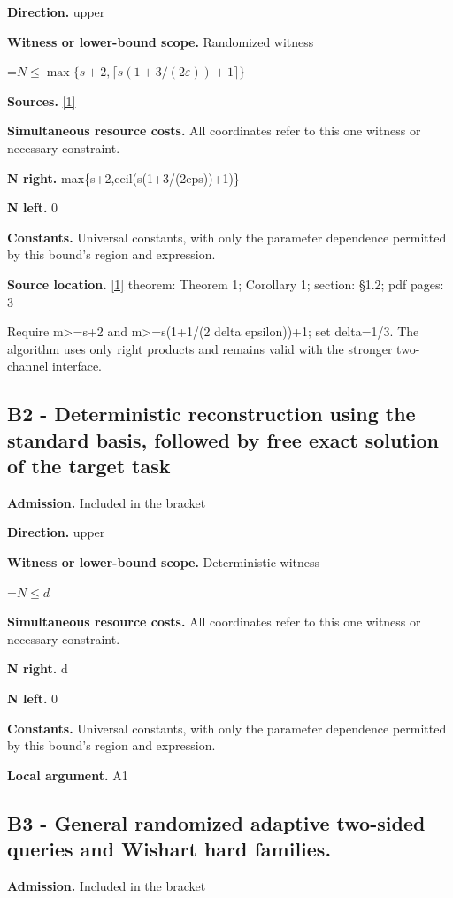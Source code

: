 \documentclass[10pt,a4paper]{article}
\newcommand{\AtlasMath}[1]{\par\begingroup\centering\setbox0=\hbox{$\displaystyle #1$}\ifdim\wd0>1.4\linewidth\typeout{ATLAS WIDE FORMULA: \the\wd0}\fi\ifdim\wd0>\linewidth\resizebox{\linewidth}{!}{\box0}\else\box0\fi\par\endgroup}
\begin{document}
\textbf{Direction.} upper

\textbf{Witness or lower-bound scope.} Randomized witness

\AtlasMath{N\le\max\{s+2,\lceil s(1+3/(2\varepsilon))+1\rceil\}}
\textbf{Sources.} \href{https://arxiv.org/pdf/2402.09379v3}{[1]}

\textbf{Simultaneous resource costs.} All coordinates refer to this one witness or necessary constraint.

\textbf{N right.} max\{s+2,ceil(s(1+3/(2eps))+1)\}

\textbf{N left.} 0

\textbf{Constants.} Universal constants, with only the parameter dependence permitted by this bound’s region and expression.

\textbf{Source location.} \href{https://arxiv.org/pdf/2402.09379v3}{[1]} theorem: Theorem 1; Corollary 1; section: §1.2; pdf pages: 3

Require m>=s+2 and m>=s(1+1/(2 delta epsilon))+1; set delta=1/3. The algorithm uses only right products and remains valid with the stronger two-channel interface.

\subsection{B2 - Deterministic reconstruction using the standard basis, followed by free exact solution of the target task}
\textbf{Admission.} Included in the bracket

\textbf{Direction.} upper

\textbf{Witness or lower-bound scope.} Deterministic witness

\AtlasMath{N\le d}
\textbf{Simultaneous resource costs.} All coordinates refer to this one witness or necessary constraint.

\textbf{N right.} d

\textbf{N left.} 0

\textbf{Constants.} Universal constants, with only the parameter dependence permitted by this bound’s region and expression.

\textbf{Local argument.} A1

\subsection{B3 - General randomized adaptive two-sided queries and Wishart hard families.}
\textbf{Admission.} Included in the bracket
\end{document}
